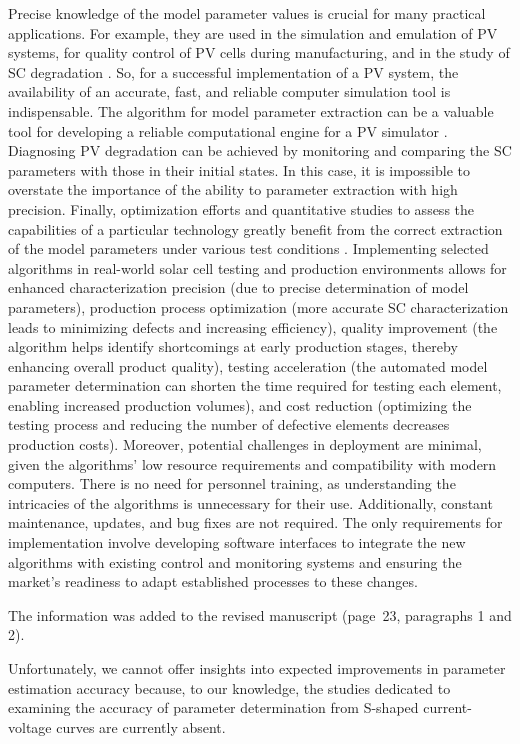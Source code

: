 \documentclass[a4paper,fleqn]{cas-sc}
\begin{document}
Precise knowledge of the model parameter values is crucial for many practical applications.
For example, they are used in the simulation and emulation of PV systems,
for quality control of PV cells during manufacturing,
and in the study of SC degradation \cite{Chin2019}.
So, for a successful implementation of a PV system, the availability of an accurate,
fast, and reliable computer simulation tool is indispensable.
The algorithm for model parameter extraction can be a valuable tool for developing a
reliable computational engine for a PV simulator \cite{Chin2017}.
Diagnosing PV degradation can be achieved by monitoring and comparing the SC parameters with those in their initial states.
In this case, it is impossible to overstate the importance of the ability to parameter extraction with high precision.
Finally, optimization efforts and quantitative studies to assess the capabilities of a particular technology greatly benefit from the correct extraction of the model parameters under various test conditions \cite{OrtizConde2006}.
Implementing selected algorithms in real-world solar cell testing and production environments allows for
enhanced characterization precision (due to precise determination of model parameters),
production process optimization (more accurate SC characterization leads to minimizing defects and increasing efficiency),
quality improvement (the algorithm helps identify shortcomings at early production stages,
thereby enhancing overall product quality),
testing acceleration (the automated model parameter determination can shorten the time
required for testing each element, enabling increased production volumes),
and cost reduction (optimizing the testing process and reducing the number of defective elements decreases production costs).
Moreover, potential challenges in deployment are minimal, given the algorithms'
low resource requirements and compatibility with modern computers.
There is no need for personnel training, as understanding the intricacies of the algorithms is unnecessary for their use.
Additionally, constant maintenance, updates, and bug fixes are not required.
The only requirements for implementation involve developing software interfaces to integrate the new algorithms with existing control and monitoring systems and ensuring the market's readiness to adapt established processes to these changes.

The information was added to the revised manuscript (page~23, paragraphs 1 and 2).

Unfortunately, we cannot offer insights into expected improvements in parameter estimation accuracy
because, to our knowledge,
the studies dedicated to examining the accuracy of parameter determination from S-shaped current-voltage curves are currently absent.




\end{document}
